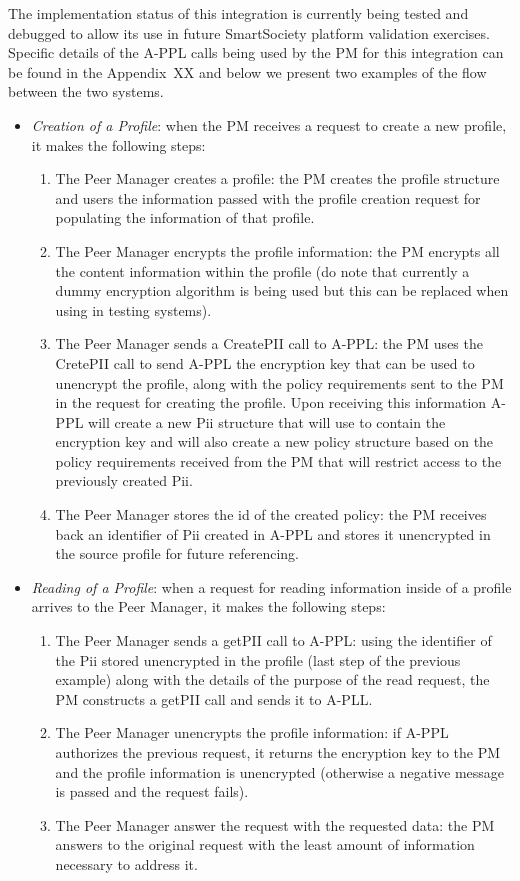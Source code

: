 The implementation status of this integration is currently being tested and debugged to allow its use in future SmartSociety platform validation exercises. Specific details of the A-PPL calls being used by the PM for this integration can be found in the Appendix~XX and below we present two examples of the flow between the two systems.
\begin{itemize}
	\item \emph{Creation of a Profile}: when the PM receives a request to create a new profile, it makes the following steps:
	\begin{enumerate}
		\item The Peer Manager creates a profile: the PM creates the profile structure and users the information passed with the profile creation request for populating the information of that profile.
		\item The Peer Manager encrypts the profile information: the PM encrypts all the content information within the profile (do note that currently a dummy encryption algorithm is being used but this can be replaced when using in testing systems).
		\item The Peer Manager sends a CreatePII call to A-PPL: the PM uses the CretePII call to send A-PPL the encryption key that can be used to unencrypt the profile, along with the policy requirements sent to the PM in the request for creating the profile. Upon receiving this information A-PPL will create a new Pii structure that will use to contain the encryption key and will also create a new policy structure based on the policy requirements received from the PM that will restrict access to the previously created Pii.
		\item The Peer Manager stores the id of the created policy: the PM receives back an identifier of Pii created in A-PPL and stores it unencrypted in the source profile for future referencing.
	\end{enumerate}
	\item \emph{Reading of a Profile}: when a request for reading information inside of a profile arrives to the Peer Manager, it makes the following steps:
	\begin{enumerate}
		\item The Peer Manager sends a getPII call to A-PPL: using the identifier of the Pii stored unencrypted in the profile (last step of the previous example) along with the details of the purpose of the read request, the PM constructs a getPII call and sends it to A-PLL.
		\item The Peer Manager unencrypts the profile information: if A-PPL authorizes the previous request, it returns the encryption key to the PM and the profile information is unencrypted (otherwise a negative message is passed and the request fails).
		\item The Peer Manager answer the request with the requested data: the PM answers to the original request with the least amount of information necessary to address it.
	\end{enumerate}
\end{itemize}